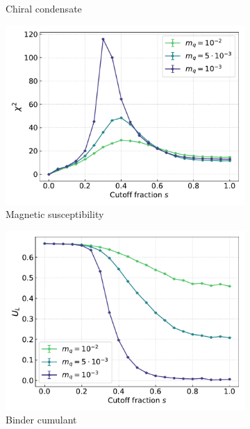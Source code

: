 \begin{figure}[h!]
\begin{subfigure}{0.47\textwidth}
    \caption{Chiral condensate}
\end{subfigure}
\begin{subfigure}{0.47\textwidth}	
	\includegraphics[width=\textwidth]{figures/chiral_PT/chi2.pdf}
    \caption{Magnetic susceptibility}
\end{subfigure}
\begin{subfigure}{0.47\textwidth}
	\includegraphics[width=\textwidth]{figures/chiral_PT/binder.pdf}
    \caption{Binder cumulant}
\end{subfigure}\\
\begin{subfigure}{0.47\textwidth}

\end{subfigure}
\end{figure}
